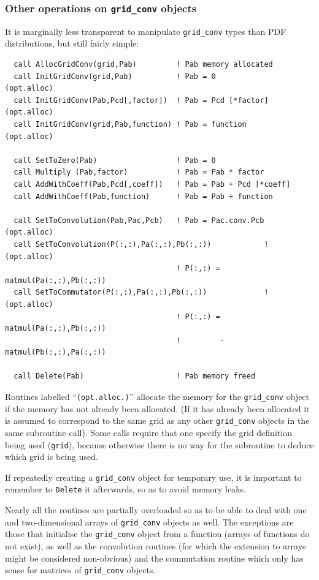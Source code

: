 \documentclass[12pt]{article}
\begin{document}
\subsubsection{Other operations on \texttt{grid\_conv} objects}
\label{sec:other_grid_conv_ops}
%
It is marginally less transparent to manipulate \texttt{grid\_conv} types
than PDF distributions, but still fairly simple:
\begin{lstlisting}
  call AllocGridConv(grid,Pab)         ! Pab memory allocated 
  call InitGridConv(grid,Pab)          ! Pab = 0             (opt.alloc)
  call InitGridConv(Pab,Pcd[,factor])  ! Pab = Pcd [*factor] (opt.alloc)
  call InitGridConv(grid,Pab,function) ! Pab = function      (opt.alloc)

  call SetToZero(Pab)                  ! Pab = 0
  call Multiply (Pab,factor)           ! Pab = Pab * factor
  call AddWithCoeff(Pab,Pcd[,coeff])   ! Pab = Pab + Pcd [*coeff]
  call AddWithCoeff(Pab,function)      ! Pab = Pab + function

  call SetToConvolution(Pab,Pac,Pcb)   ! Pab = Pac.conv.Pcb  (opt.alloc)
  call SetToConvolution(P(:,:),Pa(:,:),Pb(:,:))            ! (opt.alloc)
                                       ! P(:,:) = matmul(Pa(:,:),Pb(:,:))
  call SetToCommutator(P(:,:),Pa(:,:),Pb(:,:))             ! (opt.alloc)
                                       ! P(:,:) = matmul(Pa(:,:),Pb(:,:))
                                       !         -matmul(Pb(:,:),Pa(:,:))    

  call Delete(Pab)                     ! Pab memory freed
\end{lstlisting}
Routines labelled ``\texttt{(opt.alloc.)}'' allocate the memory for
the \texttt{grid\_conv} object if the memory has not already been
allocated. (If it has already been allocated it is assumed to
correspond to the same grid as any other \texttt{grid\_conv} objects
in the same subroutine call). Some calls require that one specify the
grid definition being used (\texttt{grid}), because otherwise there is
no way for the subroutine to deduce which grid is being used.

If repeatedly creating a \texttt{grid\_conv} object for temporary use, it is
important to remember to \texttt{Delete} it afterwards, so as to avoid
memory leaks.

Nearly all the routines are partially overloaded so as to be able to
deal with one and two-dimensional arrays of \texttt{grid\_conv}
objects as well. The exceptions are those that initialise the
\texttt{grid\_conv} object from a function (arrays of functions do not
exist), as well as the convolution routines (for which the extension
to arrays might be considered non-obvious) and the commutation routine
which only has sense for matrices of \texttt{grid\_conv} objects.
\end{document}
